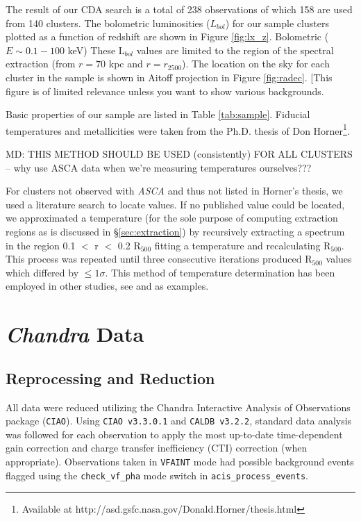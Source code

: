 \documentclass{emulateapj}
\begin{document}
The result of our CDA search is a total of 238 observations of which
158 are used from 140 clusters. The bolometric luminosities ($L_{bol}$)
for our sample clusters plotted as a function of
redshift are shown in Figure \ref{fig:lx_z}. Bolometric ($E \sim 0.1-100$ keV) 
These L$_{bol}$ values are limited to the region of the spectral extraction (from
$r=70$ kpc and $r=r_{2500}$). 
The location on the sky for each cluster in the sample is
shown in Aitoff projection in Figure \ref{fig:radec}.  [This figure is of limited relevance
unless you want to show various backgrounds.

Basic properties of our sample are listed in Table
\ref{tab:sample}. Fiducial temperatures and metallicities were taken
from the Ph.D. thesis of Don Horner\footnote{Available at
http://asd.gsfc.nasa.gov/Donald.Horner/thesis.html}. 

MD: THIS METHOD SHOULD BE USED (consistently) FOR ALL CLUSTERS -- why
use ASCA data when we're measuring temperatures ourselves???

For clusters not
observed with {\textit{ASCA}} and thus not listed in Horner's thesis,
we used a literature search to locate values. If no published value
could be located, we approximated a temperature (for the sole purpose
of computing extraction regions as is discussed in
\S\ref{sec:extraction}) by recursively extracting a spectrum in the
region 0.1 $<$ r $<$ 0.2 R$_{500}$ fitting a temperature and recalculating
R$_{500}$. This process was repeated until three consecutive
iterations produced R$_{500}$ values which differed by $\leq
1\sigma$. This method of temperature determination has been employed
in other studies, see \cite{2006MNRAS.tmp.1068S} and
\cite{2006ApJS..162..304H} as examples.

\section{\textit{Chandra} Data}\label{sec:data}

\subsection{Reprocessing and Reduction}\label{sec:reprocessing}

All data were reduced 
utilizing the Chandra Interactive Analysis of Observations package
({\tt CIAO}). Using {\tt CIAO v3.3.0.1} and {\tt CALDB v3.2.2}, standard data
analysis was followed for each observation to apply the most up-to-date
time-dependent gain correction and charge transfer inefficiency (CTI) correction (when
appropriate)\citep{2000ApJ...534L.139T}. Observations taken in {\tt VFAINT}
mode had possible background events flagged using the {\tt check\_vf\_pha}
mode switch in {\tt acis\_process\_events}.
\end{document}
